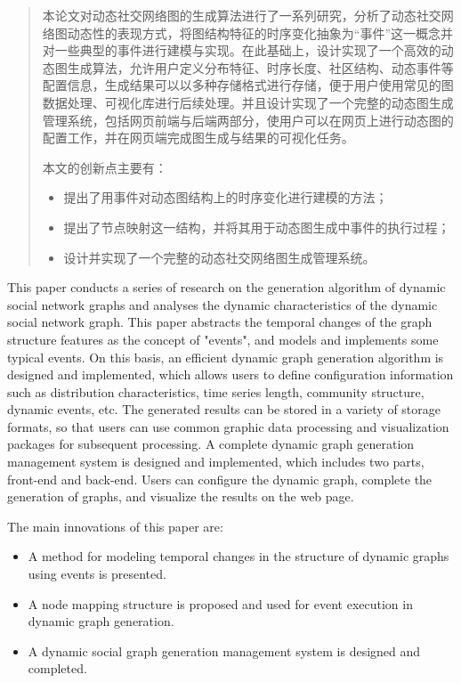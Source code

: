 

\begin{abstract}
  本论文对动态社交网络图的生成算法进行了一系列研究，分析了动态社交网络图动态性的表现方式，将图结构特征的时序变化抽象为“事件”这一概念并对一些典型的事件进行建模与实现。在此基础上，设计实现了一个高效的动态图生成算法，允许用户定义分布特征、时序长度、社区结构、动态事件等配置信息，生成结果可以以多种存储格式进行存储，便于用户使用常见的图数据处理、可视化库进行后续处理。并且设计实现了一个完整的动态图生成管理系统，包括网页前端与后端两部分，使用户可以在网页上进行动态图的配置工作，并在网页端完成图生成与结果的可视化任务。

  本文的创新点主要有：
  \begin{itemize}
    \item 提出了用事件对动态图结构上的时序变化进行建模的方法；
    \item 提出了节点映射这一结构，并将其用于动态图生成中事件的执行过程；
    \item 设计并实现了一个完整的动态社交网络图生成管理系统。
  \end{itemize}

\end{abstract}

\begin{abstract*}
  This paper conducts a series of research on the generation algorithm of dynamic social network graphs and analyses the dynamic characteristics of the dynamic social network graph. This paper abstracts the temporal changes of the graph structure features as the concept of "events", and models and implements some typical events. On this basis, an efficient dynamic graph generation algorithm is designed and implemented, which allows users to define configuration information such as distribution characteristics, time series length, community structure, dynamic events, etc. The generated results can be stored in a variety of storage formats, so that users can use common graphic data processing and visualization packages for subsequent processing. A complete dynamic graph generation management system is designed and implemented, which includes two parts, front-end and back-end. Users can configure the dynamic graph, complete the generation of graphs, and visualize the results on the web page.

  The main innovations of this paper are:
  \begin{itemize}
    \item A method for modeling temporal changes in the structure of dynamic graphs using events is presented.
    \item A node mapping structure is proposed and used for event execution in dynamic graph generation.
    \item A dynamic social graph generation management system is designed and completed.
  \end{itemize}

\end{abstract*}
